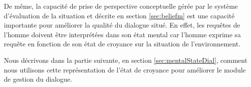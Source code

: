 \documentclass[a4paper,11pt,twoside]{StyleThese}
\begin{document}
De même, la capacité de prise de perspective conceptuelle gérée par le système d'évaluation de la situation et décrite en section \ref{sec:beliefm} est une capacité importante pour améliorer la qualité du dialogue situé.
En effet, les requêtes de l'homme doivent être interprétées dans son état mental car l'homme exprime sa requête en fonction de son état de croyance sur la situation de l'environnement.

Nous décrivons dans la partie suivante, en section \ref{sec:mentalStateDial}, comment nous utilisons cette représentation de l'état de croyance pour améliorer le module de gestion du dialogue.



\end{document}

